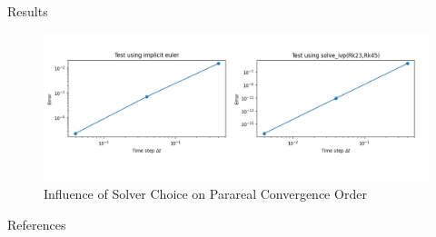 \documentclass[aspectratio=169,xcolor=dvipsnames, t]{beamer}
\begin{document}
\begin{frame}{Results}
    \begin{figure}[ht!]
    \centering
    \includegraphics[width=1\textwidth]{figures/order_converge.png}
    \caption{Influence of Solver Choice on Parareal Convergence Order}
    \label{fig:9}
\end{figure}
\end{frame}


\begin{frame}[allowframebreaks]{References}
    \nocite{*}
    
	\small
\end{frame}

\makefinalpage
\end{document}
